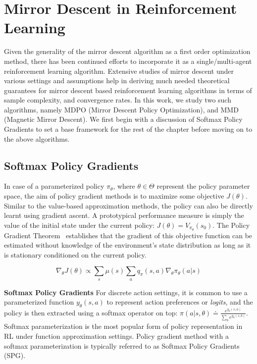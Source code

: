 \chapter{Mirror Descent in Reinforcement Learning}

Given the generality of the mirror descent algorithm as a first order optimization method, there
has been continued efforts to incorporate it as a single/multi-agent reinforcement learning
algorithm.
Extensive studies of mirror descent under various settings and assumptions help in deriving much
needed theoretical guarantees for mirror descent based reinforcement learning algorithms in terms
of sample complexity, and convergence rates.
In this work, we study two such algorithms, namely MDPO (Mirror Descent Policy Optimization), and
MMD (Magnetic Mirror Descent).
We first begin with a discussion of Softmax Policy Gradients to set a base framework for the rest
of the chapter before moving on to the above algorithms.

\section[SPG]{Softmax Policy Gradients}
\label{sec:spg}
In case of a parameterized policy $\pi_\theta$, where $\theta \in \Theta$ represent the policy
parameter space, the aim of policy gradient methods is to maximize some objective $J(\theta)$.
Similar to the value-based approximation methods, the policy can also be directly learnt using
gradient ascent.
A prototypical performance measure is simply the value of the initial state under the current
policy: $J(\theta) = V_{\pi_\theta}(s_0)$.
The Policy Gradient Theorem~\cite[Chapter 13.2]{suttonReinforcement2018} establishes that the
gradient of this objective function can be estimated without knowledge of the environment's state
distribution as long as it is stationary conditioned on the current policy.

$$ \nabla_\theta J(\theta) \propto \sum_s \mu(s) \sum_a q_\pi(s,a) \nabla_\theta \pi_\theta(a|s) $$

\textbf{Softmax Policy Gradients}
For discrete action settings, it is common to use a parameterized function $y_\theta(s, a)$ to
represent action preferences or \textit{logits}, and the policy is then extracted using a softmax
operator on top: $\pi(a|s, \theta) \doteq \frac{e^{y_\theta(s, a)}}{\sum_b e^{y_\theta(s,b)}}$.
Softmax parameterization is the most popular form of policy representation in RL under function
approximation settings.
Policy gradient method with a softmax parameterization is typically referred to as Softmax Policy
Gradients (SPG).

